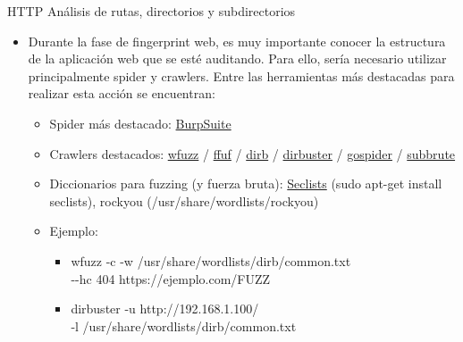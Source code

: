 \documentclass[aspectratio=169,11pt]{beamer}
\begin{document}
\begin{frame}[allowframebreaks]{HTTP}
\small
Análisis de rutas, directorios y subdirectorios

\begin{itemize}
  \item Durante la fase de fingerprint web, es muy importante conocer la estructura de la aplicación web que se esté auditando. Para ello, sería necesario utilizar principalmente spider y crawlers. Entre las herramientas más destacadas para realizar esta acción se encuentran:
    \begin{itemize}
  \item Spider más destacado: \href{https://portswigger.net/burp}{BurpSuite}
  \item Crawlers destacados: \href{https://github.com/xmendez/wfuzz}{wfuzz} / \href{https://github.com/ffuf/ffuf}{ffuf} / \href{https://dirb.sourceforge.net/}{dirb} / \href{https://owasp.org/www-project-dirbuster/}{dirbuster} / \href{https://github.com/jaeles-project/gospider}{gospider} / \href{https://github.com/TheRook/subbrute}{subbrute}
  \item Diccionarios para fuzzing (y fuerza bruta): \href{https://github.com/danielmiessler/SecLists}{Seclists} (sudo apt-get install seclists), rockyou (/usr/share/wordlists/rockyou)
  \item Ejemplo:
    \begin{itemize}
  \item wfuzz -c -w /usr/share/wordlists/dirb/common.txt \\
  -{}-hc 404 https://ejemplo.com/FUZZ
  \item dirbuster -u http://192.168.1.100/ \\
          -l /usr/share/wordlists/dirb/common.txt
    \end{itemize}
    \end{itemize}
  \end{itemize}
\end{frame}
\end{document}
